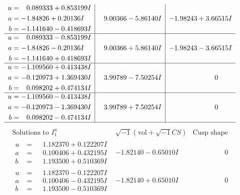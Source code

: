 \documentclass[1p]{elsarticle_modified}
\theoremstyle{definition}
\newcommand{\I}{\sqrt{-1}}
\begin{document}
$$\begin{array}{c|c|c}
\begin{aligned}
u &= \phantom{-}0.089333 + 0.853199 I \\
a &= -1.84826 + 0.20136 I \\
b &= -1.141640 - 0.418693 I\end{aligned}
 & \phantom{-}9.00366 - 5.86140 I & -1.98243 + 3.66515 I \\ \hline\begin{aligned}
u &= \phantom{-}0.089333 - 0.853199 I \\
a &= -1.84826 - 0.20136 I \\
b &= -1.141640 + 0.418693 I\end{aligned}
 & \phantom{-}9.00366 + 5.86140 I & -1.98243 - 3.66515 I \\ \hline\begin{aligned}
u &= -1.109560 + 0.413438 I \\
a &= -0.120973 + 1.369430 I \\
b &= \phantom{-}0.098202 + 0.474134 I\end{aligned}
 & \phantom{-}3.99789 - 7.50254 I & \phantom{-0.000000 } 0 \\ \hline\begin{aligned}
u &= -1.109560 - 0.413438 I \\
a &= -0.120973 - 1.369430 I \\
b &= \phantom{-}0.098202 - 0.474134 I\end{aligned}
 & \phantom{-}3.99789 + 7.50254 I & \phantom{-0.000000 } 0\\
 \hline 
 \end{array}$$\newpage$$\begin{array}{c|c|c}  
\text{Solutions to }I^u_{1}& \I (\text{vol} + \sqrt{-1}CS) & \text{Cusp shape}\\
 \hline 
\begin{aligned}
u &= \phantom{-}1.182370 + 0.122207 I \\
a &= \phantom{-}0.100406 + 0.432195 I \\
b &= \phantom{-}1.193500 + 0.510369 I\end{aligned}
 & -1.82140 - 0.65010 I & \phantom{-0.000000 } 0 \\ \hline\begin{aligned}
u &= \phantom{-}1.182370 - 0.122207 I \\
a &= \phantom{-}0.100406 - 0.432195 I \\
b &= \phantom{-}1.193500 - 0.510369 I\end{aligned}
 & -1.82140 + 0.65010 I & \phantom{-0.000000 } 0 \\ \hline\begin{aligned}

\end{aligned}
\end{array}$$
\end{document}
